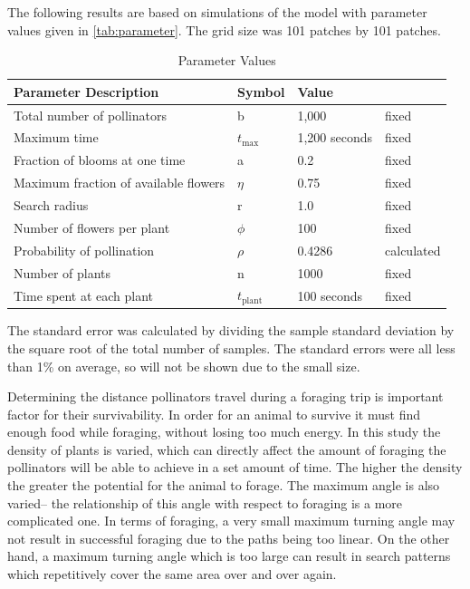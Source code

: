 The following results are based on simulations of the model with parameter
values given in \autoref{tab:parameter}.  The grid size was 101 patches by 101
patches.

\begin{table}
  \begin{tabular}{|l|l|l|l|}
    \hline
    Parameter Description & Symbol & Value &  \\ \hline  \label{parameter}
    Total number of pollinators & b & 1,000 & fixed  \\ \hline
    Maximum time & $t_{\text{max}}$ & 1,200 seconds & fixed \\ \hline
    Fraction of blooms at one time & a & 0.2 & fixed \\ \hline
    Maximum fraction of available flowers & $\eta$ & 0.75 & fixed \\ \hline
    Search radius & r & 1.0 & fixed \\ \hline
    Number of flowers per plant & $\phi$ & 100 & fixed \\ \hline
    Probability of pollination   & $\rho$ & 0.4286 & calculated \\ \hline
    Number of plants & n & 1000 & fixed \\ \hline
    Time spent at each plant & $t_{\text{plant}}$ & 100 seconds & fixed \\ \hline
  \end{tabular}
  \caption{Parameter Values}
  \label{tab:parameter}
\end{table}

The standard error was calculated by dividing the sample standard deviation by
the square root of the total number of samples.   The standard errors were all
less than 1\% on average, so will not be shown due to the small size.

Determining the distance pollinators travel during a foraging trip is important
factor for their survivability.  In order for an animal to survive it must find
enough food while foraging, without losing too much energy.  In this study the
density of plants is varied, which can directly affect the amount of foraging
the pollinators will be able to achieve in a set amount of time.  The higher the
density the greater the potential for the animal to forage.  The maximum angle
is also varied-- the relationship of this angle with respect to foraging is a
more complicated one.  In terms of foraging, a very small maximum turning angle
may not result in successful foraging due to the paths being too linear.  On the
other hand, a maximum turning angle which is too large can result in search
patterns which repetitively cover the same area over and over again.


